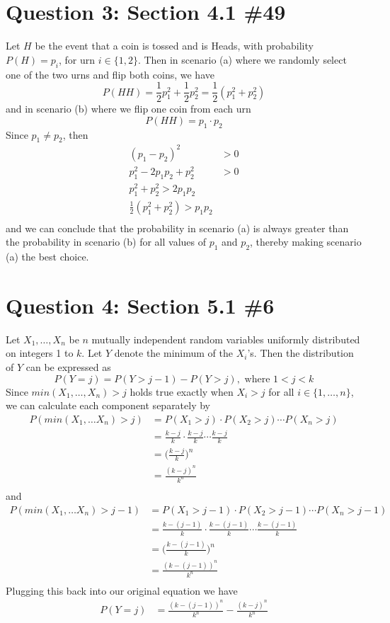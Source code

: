 \documentclass[11pt, oneside]{article}   	%
\begin{document}
\section*{Question 3: Section 4.1 \#49}
Let $H$ be the event that a coin is tossed and is Heads, with probability $P(H) = p_i$, for urn $i \in \{1,2\}$. Then in scenario (a) where we randomly select one of the two urns and flip both coins, we have 
	$$P(HH) = \frac{1}{2} p_1^2 + \frac{1}{2} p_2^2 = \frac{1}{2} (p_1^2+p_2^2)$$
and in scenario (b) where we flip one coin from each urn
	$$P(HH) = p_1 \cdot p_2$$
Since $p_1 \neq p_2$, then
	\begin{align*}
		(p_1 - p_2)^2 & > 0 \\
		p_1^2 - 2p_1p_2 + p_2^2 & > 0 \\
		p_1^2 + p_2^2 > 2p_1p_2 \\
		\frac{1}{2} (p_1^2 + p_2^2) > p_1p_2 \\
	\end{align*}
and we can conclude that the probability in scenario (a) is always greater than the probability in scenario (b) for all values of $p_1$ and $p_2$, thereby making scenario (a) the best choice.



\section*{Question 4: Section 5.1 \#6}

Let $X_1, \ldots , X_n$ be $n$ mutually independent random variables uniformly distributed on integers 1 to $k$. Let $Y$ denote the minimum of the $X_i$'s. Then the distribution of $Y$ can be expressed as
	$$P(Y=j) = P(Y > j-1) - P(Y > j),  \text{ where } 1<j<k $$
Since $min(X_1, \ldots, X_n) > j$ holds true exactly when $X_i > j$ for all $i \in \{1,\ldots,n\}$, we can calculate each component separately by
	\begin{align*}
		P(min(X_1, \ldots X_n) > j) & = P(X_1 > j)\cdot P(X_2 > j) \cdots P(X_n > j) \\
		& = \frac{k-j}{k} \cdot  \frac{k-j}{k} \cdots  \frac{k-j}{k} \\
		& = \Big(\frac{k-j}{k}\Big)^n \\
		& = \frac{(k-j)^n}{k^n} \\
	\end{align*}
and
	\begin{align*}
		P(min(X_1, \ldots X_n) > j-1) & = P(X_1 > j-1)\cdot P(X_2 > j-1) \cdots P(X_n > j-1) \\
		& = \frac{k-(j-1)}{k} \cdot \frac{k-(j-1)}{k} \cdots \frac{k-(j-1)}{k} \\
		& = \Big(\frac{k-(j-1)}{k}\Big)^n \\
		& = \frac{(k-(j-1))^n}{k^n} \\
	\end{align*}
Plugging this back into our original equation we have
	\begin{align*}
		P(Y=j) & =  \frac{(k-(j-1))^n}{k^n} -\frac{(k-j)^n}{k^n} \\
	\end{align*}
\end{document}
